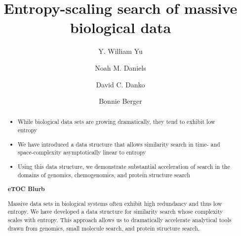 \documentclass[review,preprint,12pt]{elsarticle}
\theoremstyle{definition}
\theoremstyle{remark}
\numberwithin{equation}{section}
\begin{document}
\begin{frontmatter}

\title{ %
Entropy-scaling search of massive biological data}

\author[mitmath,mitcsail]{Y. William Yu}
\author[mitmath,mitcsail]{Noah M. Daniels}
\author[mitcsail]{David C. Danko}
\author[mitmath,mitcsail]{Bonnie Berger}
\address[mitmath]{Department of Mathematics, Massachusetts Institute of Technology, Cambridge, Massachusetts 02139}
\address[mitcsail]{Computer Science and AI Lab, Massachusetts Institute of Technology, Cambridge, Massachusetts 02139}






\begin{abstract}
    \begin{itemize}
        \item While biological data sets are growing dramatically, they tend to exhibit low entropy
        \item We have introduced a data structure that allows similarity search in time- and space-complexity asymptotically linear to entropy
        \item Using this data structure, we demonstrate substantial acceleration of search in the domains of genomics, chemogenomics, and protein structure search
    \end{itemize}
\noindent\unskip\textbf{eTOC Blurb}
\par\medskip\noindent\unskip\ignorespaces
Massive data sets in biological systems often exhibit high redundancy and thus low entropy.
We have developed a data structure for similarity search whose complexity scales with entropy.
This approach allows us to dramatically accelerate analytical tools drawn from genomics, small molecule search, and protein structure search.
\end{abstract}

\end{frontmatter}
\end{document}
